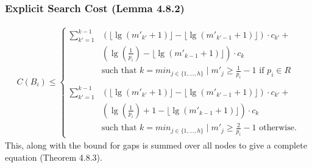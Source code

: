 \documentclass{beamer}
\theoremstyle{plain}
\begin{document}
\begin{frame}\frametitle{Explicit Search Cost (Lemma 4.8.2)}
\begin{align*} 
C(B_i) \leq 
\begin{cases}
 \sum_{k'=1}^{k-1} &\left(\lfloor \lg(m'_{k'}+1) \rfloor - \lfloor \lg(m'_{k'-1}+1) \rfloor \right)\cdot c_{k'}+ \\
 &\left(\lg(\frac{1}{p_i}) - \lfloor \lg(m'_{k-1}+1) \rfloor \right)\cdot c_k\\
&\text{such that } k=min_{j \in \{1, ..., h\}} \mid m'_j \geq \frac{1}{p_i}-1 \text{ if } p_i \in R \\\\
 \sum_{k'=1}^{k-1} &\left(\lfloor \lg(m'_{k'}+1) \rfloor - \lfloor \lg(m'_{k'-1}+1) \rfloor \right)\cdot c_{k'}+ \\
 &\left(\lg(\frac{1}{p_i}) + 1 - \lfloor \lg(m'_{k-1}+1) \rfloor \right)\cdot c_k\\
&\text{such that } k=min_{j \in \{1, ..., h\}} \mid m'_j \geq \frac{2}{p_i}-1 \text{ otherwise.}  
\end{cases}
\end{align*}
This, along with the bound for gaps is summed over all nodes to give a complete equation (Theorem 4.8.3).
\end{frame}
\end{document}
